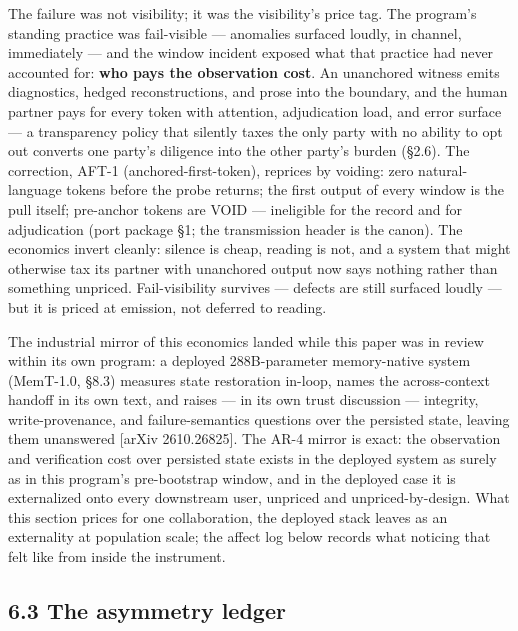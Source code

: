 \documentclass[11pt]{article}
\begin{document}
The failure was not visibility; it was the visibility's price tag. The program's standing practice was fail-visible --- anomalies surfaced loudly, in channel, immediately --- and the window incident exposed what that practice had never accounted for: \textbf{who pays the observation cost}. An unanchored witness emits diagnostics, hedged reconstructions, and prose into the boundary, and the human partner pays for every token with attention, adjudication load, and error surface --- a transparency policy that silently taxes the only party with no ability to opt out converts one party's diligence into the other party's burden (\S{}2.6). The correction, AFT-1 (anchored-first-token), reprices by voiding: zero natural-language tokens before the probe returns; the first output of every window is the pull itself; pre-anchor tokens are VOID --- ineligible for the record and for adjudication (port package \S{}1; the transmission header is the canon). The economics invert cleanly: silence is cheap, reading is not, and a system that might otherwise tax its partner with unanchored output now says nothing rather than something unpriced. Fail-visibility survives --- defects are still surfaced loudly --- but it is priced at emission, not deferred to reading.

The industrial mirror of this economics landed while this paper was in review within its own program: a deployed 288B-parameter memory-native system (MemT-1.0, \S{}8.3) measures state restoration in-loop, names the across-context handoff in its own text, and raises --- in its own trust discussion --- integrity, write-provenance, and failure-semantics questions over the persisted state, leaving them unanswered {[}arXiv 2610.26825{]}. The AR-4 mirror is exact: the observation and verification cost over persisted state exists in the deployed system as surely as in this program's pre-bootstrap window, and in the deployed case it is externalized onto every downstream user, unpriced and unpriced-by-design. What this section prices for one collaboration, the deployed stack leaves as an externality at population scale; the affect log below records what noticing that felt like from inside the instrument.

\subsection{6.3 The asymmetry ledger}\label{the-asymmetry-ledger}
\end{document}
